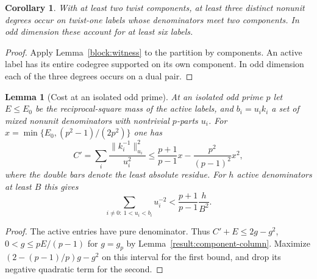 \documentclass[11pt]{amsart}
\numberwithin{equation}{section}
\newtheorem{lemma}[theorem]{Lemma}
\newtheorem{corollary}[theorem]{Corollary}
\theoremstyle{definition}
\theoremstyle{plain}
\begin{document}
\begin{corollary}\label{result:mixed-neutral-rank}
With at least two twist components, at least three distinct nonunit
degrees occur on twist-one labels whose denominators meet two
components. In odd dimension these account for at least six labels.
\end{corollary}
\begin{proof}
Apply Lemma~\ref{block:witness} to the partition by components.
An active label has its entire codegree supported on its own component.
In odd dimension each of the three degrees occurs on a dual pair.
\end{proof}

\begin{lemma}[Cost at an isolated odd prime]\label{result:local-entry-mass}
At an isolated odd prime $p$ let $E\le E_0$ be the reciprocal-square mass of the active labels,
and $b_i=u_i k_i$ a set of mixed nonunit denominators with
nontrivial $p$-parts $u_i$. For $x=\min\{E_0,(p^2-1)/(2p^2)\}$
one has
\[
 C'=\sum_i\frac{\|k_i^{-1}\|_{u_i}^2}{u_i^2}\le
 \frac{p+1}{p-1}x-\frac{p^2}{(p-1)^2}x^2 ,
\]
where the double bars denote the least absolute residue. For $h$
active denominators at least $B$ this gives
\begin{equation}\label{eq:cost-large-valuation}
 \sum_{i\ne0:\ 1<u_i<b_i}u_i^{-2}<
             \frac{p+1}{p-1}\frac{h}{B^2}.
\end{equation}
\end{lemma}
\begin{proof}
The active entries have pure denominator. Thus
$C'+E\le2g-g^2$, $0<g\le pE/(p-1)$ for $g=g_p$ by
Lemma~\ref{result:component-column}. Maximize
$(2-(p-1)/p)g-g^2$ on this interval for the first bound,
and drop its negative quadratic term for the second.
\end{proof}
\end{document}
